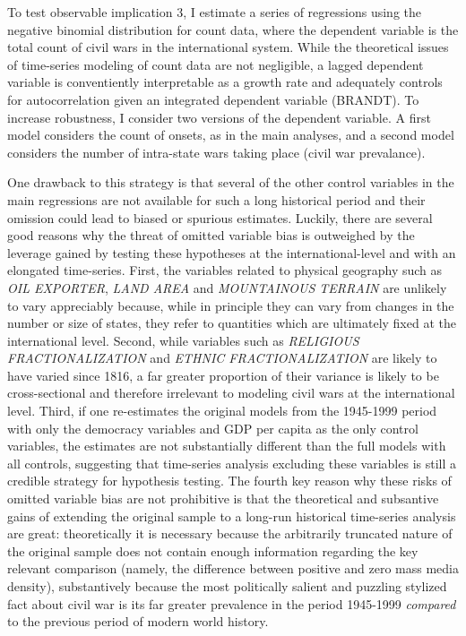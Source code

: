 \documentclass[11pt,article,oneside]{memoir}
\begin{document}
To test observable implication 3, I estimate a series of regressions
using the negative binomial distribution for count data, where the
dependent variable is the total count of civil wars in the international
system. While the theoretical issues of time-series modeling of count
data are not negligible, a lagged dependent variable is conventiently
interpretable as a growth rate and adequately controls for
autocorrelation given an integrated dependent variable (BRANDT). To
increase robustness, I consider two versions of the dependent variable.
A first model considers the count of onsets, as in the main analyses,
and a second model considers the number of intra-state wars taking place
(civil war prevalance).

One drawback to this strategy is that several of the other control
variables in the main regressions are not available for such a long
historical period and their omission could lead to biased or spurious
estimates. Luckily, there are several good reasons why the threat of
omitted variable bias is outweighed by the leverage gained by testing
these hypotheses at the international-level and with an elongated
time-series. First, the variables related to physical geography such as
\emph{OIL EXPORTER}, \emph{LAND AREA} and \emph{MOUNTAINOUS TERRAIN} are
unlikely to vary appreciably because, while in principle they can vary
from changes in the number or size of states, they refer to quantities
which are ultimately fixed at the international level. Second, while
variables such as \emph{RELIGIOUS FRACTIONALIZATION} and \emph{ETHNIC
FRACTIONALIZATION} are likely to have varied since 1816, a far greater
proportion of their variance is likely to be cross-sectional and
therefore irrelevant to modeling civil wars at the international level.
Third, if one re-estimates the original models from the 1945-1999 period
with only the democracy variables and GDP per capita as the only control
variables, the estimates are not substantially different than the full
models with all controls, suggesting that time-series analysis excluding
these variables is still a credible strategy for hypothesis testing. The
fourth key reason why these risks of omitted variable bias are not
prohibitive is that the theoretical and subsantive gains of extending
the original sample to a long-run historical time-series analysis are
great: theoretically it is necessary because the arbitrarily truncated
nature of the original sample does not contain enough information
regarding the key relevant comparison (namely, the difference between
positive and zero mass media density), substantively because the most
politically salient and puzzling stylized fact about civil war is its
far greater prevalence in the period 1945-1999 \emph{compared} to the
previous period of modern world history.
\end{document}

